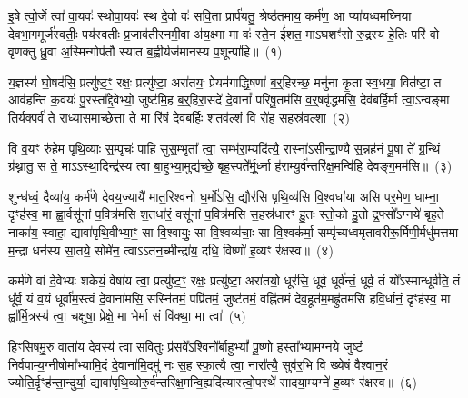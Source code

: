 
\setcounter{anuvakam}{0}
इ॒षे त्वो॒र्जे त्वा॑ वा॒यवः॑ स्थोपा॒यवः॑ स्थ दे॒वो वः॑ सवि॒ता प्रार्प॑यतु॒ श्रेष्ठ॑तमाय॒ कर्म॑ण॒ आ प्या॑यध्वमघ्निया देवभा॒गमूर्ज॑स्वतीः॒ पय॑स्वतीः प्र॒जाव॑तीरनमी॒वा अ॑य॒क्ष्मा मा वः॑ स्ते॒न ई॑शत॒ मा\-ऽघशꣳ॑सो रु॒द्रस्य॑ हे॒तिः परि॑ वो वृणक्तु ध्रु॒वा अ॒स्मिन्गोप॑तौ स्यात ब॒ह्वीर्यज॑मानस्य प॒शून्पा॑हि॥~(१)

{\anuvakamend[{इ॒षे त्रिच॑त्वारिꣳशत्}]}

य॒ज्ञस्य॑ घो॒षद॑सि॒ प्रत्यु॑ष्ट॒ꣳ॒ रक्षः॒ प्रत्यु॑ष्टा॒ अरा॑तयः॒ प्रेयम॑गाद्धि॒षणा॑ ब॒र्॒हिरच्छ॒ मनु॑ना कृ॒ता स्व॒धया॒ वित॑ष्टा॒ त आव॑हन्ति क॒वयः॑ पु॒रस्ता᳚द्दे॒वेभ्यो॒ जुष्ट॑मि॒ह ब॒र्॒हिरा॒सदे॑ दे॒वानां᳚ परिषू॒तम॑सि व॒र्॒षवृ॑द्धमसि॒ देव॑बर्\mbox{}हि॒र्मा त्वा॒\-ऽन्वङ्मा ति॒र्यक्पर्व॑ ते राध्यासमाच्छे॒त्ता ते॒ मा रि॑षं॒ देव॑बर्\mbox{}हिः श॒तव॑ल्\mbox{}शं॒ वि रो॑ह स॒हस्र॑वल्\mbox{}शा॒~(२)

वि व॒यꣳ रु॑हेम पृथि॒व्याः स॒म्पृचः॑ पाहि सुस॒म्भृता᳚ त्वा॒ सम्भ॑रा॒म्यदि॑त्यै॒ रास्ना॑\-ऽसीन्द्रा॒ण्यै स॒न्नह॑नं पू॒षा ते᳚ ग्र॒न्थिं ग्र॑थ्नातु॒ स ते॒ मा\-ऽऽ\-स्था॒दिन्द्र॑स्य त्वा बा॒हुभ्या॒मुद्य॑च्छे॒ बृह॒स्पते᳚र्मू॒र्ध्ना ह॑राम्यु॒र्व॑न्तरि॑क्ष॒मन्वि॑हि देवङ्ग॒मम॑सि॥~(३)

{\anuvakamend[{स॒हस्र॑वल्\mbox{}शा अ॒ष्टात्रिꣳ॑शच्च}]}

शुन्ध॑ध्वं॒ दैव्या॑य॒ कर्म॑णे देवय॒ज्यायै॑ मात॒रिश्व॑नो घ॒र्मो॑\-ऽसि॒ द्यौर॑सि पृथि॒व्य॑सि वि॒श्वधा॑या असि पर॒मेण॒ धाम्ना॒ दृꣳह॑स्व॒ मा ह्वा॒र्वसू॑नां प॒वित्र॑मसि श॒तधा॑रं॒ वसू॑नां प॒वित्र॑मसि स॒हस्र॑धारꣳ हु॒तः स्तो॒को हु॒तो द्र॒फ्सो᳚\-ऽग्नये॑ बृह॒ते नाका॑य॒ स्वाहा॒ द्यावा॑\-पृथि॒वीभ्या॒ꣳ॒ सा वि॒श्वायुः॒ सा वि॒श्वव्य॑चाः॒ सा वि॒श्वक॑र्मा॒ सम्पृ॑च्यध्वमृतावरीरू॒र्मिणी॒र्मधु॑मत्तमा म॒न्द्रा धन॑स्य सा॒तये॒ सोमे॑न॒ त्वा\-ऽऽ\-त॑न॒च्मीन्द्रा॑य॒ दधि॒ विष्णो॑ ह॒व्यꣳ र॑क्षस्व॥~(४)

{\anuvakamend[{सोमे॑ना॒ष्टौ च॑}]}

कर्म॑णे वां दे॒वेभ्यः॑ शकेयं॒ वेषा॑य त्वा॒ प्रत्यु॑ष्ट॒ꣳ॒ रक्षः॒ प्रत्यु॑ष्टा॒ अरा॑तयो॒ धूर॑सि॒ धूर्व॒ धूर्व॑न्तं॒ धूर्व॒ तं यो᳚\-ऽस्मान्धूर्व॑ति॒ तं धू᳚र्व॒ यं व॒यं धूर्वा॑म॒स्त्वं दे॒वाना॑मसि॒ सस्नि॑तमं॒ पप्रि॑तमं॒ जुष्ट॑तमं॒ वह्नि॑तमं देव॒हूत॑म॒मह्रु॑तमसि हवि॒र्धानं॒ दृꣳह॑स्व॒ मा ह्वा᳚र्मि॒त्रस्य॑ त्वा॒ चक्षु॑षा॒ प्रेक्षे॒ मा भेर्मा सं वि॑क्था॒ मा त्वा॑~(५)

हिꣳसिषमु॒रु वाता॑य दे॒वस्य॑ त्वा सवि॒तुः प्र॑स॒वे᳚\-ऽश्विनो᳚र्बा॒हु\-भ्यां᳚ पू॒ष्णो हस्ता᳚भ्याम॒ग्नये॒ जुष्टं॒ निर्व॑पाम्य॒ग्नी\-षोमा᳚भ्यामि॒दं दे॒वाना॑मि॒दमु॑ नः स॒ह स्फा॒त्यै त्वा॒ नारा᳚त्यै॒ सुव॑र॒भि वि ख्ये॑षं वैश्वान॒रं ज्योति॒र्दृꣳह॑न्ता॒न्दुर्या॒ द्यावा॑\-पृथि॒व्योरु॒र्व॑न्तरि॑क्ष॒\-मन्वि॒ह्यदि॑त्यास्त्वो॒\-पस्थे॑ सादया॒म्यग्ने॑ ह॒व्यꣳ र॑क्षस्व॥~(६)

